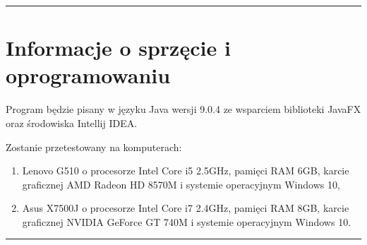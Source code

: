 \documentclass[a4paper,11pt]{article}
\newcommand{\linia}{\rule{\linewidth}{0.4mm}}
\begin{document}
\noindent\linia
\section{Informacje o sprzęcie i oprogramowaniu}
Program będzie pisany w języku Java wersji 9.0.4 ze wsparciem biblioteki JavaFX oraz środowiska Intellij IDEA.

Zostanie przetestowany na komputerach:
\begin{enumerate}
\item Lenovo G510 o procesorze Intel Core i5 2.5GHz, pamięci RAM 6GB, karcie graficznej AMD Radeon
HD 8570M i systemie operacyjnym Windows 10,
\item Asus X7500J o procesorze Intel Core i7 2.4GHz, pamięci RAM 8GB, karcie graficznej NVIDIA GeForce GT 740M i systemie operacyjnym Windows 10. 
\end{enumerate} 
\noindent\linia
\end{document}
